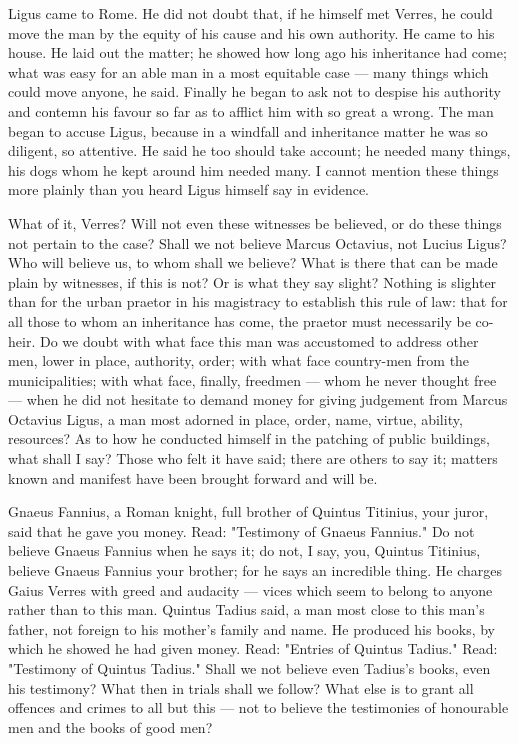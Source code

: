  Ligus came to Rome. He did not doubt that, if he himself met Verres, he could move the man by the equity of his cause and his own authority. He came to his house. He laid out the matter; he showed how long ago his inheritance had come; what was easy for an able man in a most equitable case --- many things which could move anyone, he said. Finally he began to ask not to despise his authority and contemn his favour so far as to afflict him with so great a wrong. The man began to accuse Ligus, because in a windfall and inheritance matter he was so diligent, so attentive. He said he too should take account; he needed many things, his dogs whom he kept around him needed many. I cannot mention these things more plainly than you heard Ligus himself say in evidence.

 What of it, Verres? Will not even these witnesses be believed, or do these things not pertain to the case? Shall we not believe Marcus Octavius, not Lucius Ligus? Who will believe us, to whom shall we believe? What is there that can be made plain by witnesses, if this is not? Or is what they say slight? Nothing is slighter than for the urban praetor in his magistracy to establish this rule of law: that for all those to whom an inheritance has come, the praetor must necessarily be co-heir. Do we doubt with what face this man was accustomed to address other men, lower in place, authority, order; with what face country-men from the municipalities; with what face, finally, freedmen --- whom he never thought free --- when he did not hesitate to demand money for giving judgement from Marcus Octavius Ligus, a man most adorned in place, order, name, virtue, ability, resources? As to how he conducted himself in the patching of public buildings, what shall I say? Those who felt it have said; there are others to say it; matters known and manifest have been brought forward and will be.

 Gnaeus Fannius, a Roman knight, full brother of Quintus Titinius, your juror, said that he gave you money. Read: "Testimony of Gnaeus Fannius." Do not believe Gnaeus Fannius when he says it; do not, I say, you, Quintus Titinius, believe Gnaeus Fannius your brother; for he says an incredible thing. He charges Gaius Verres with greed and audacity --- vices which seem to belong to anyone rather than to this man. Quintus Tadius said, a man most close to this man's father, not foreign to his mother's family and name. He produced his books, by which he showed he had given money. Read: "Entries of Quintus Tadius." Read: "Testimony of Quintus Tadius." Shall we not believe even Tadius's books, even his testimony? What then in trials shall we follow? What else is to grant all offences and crimes to all but this --- not to believe the testimonies of honourable men and the books of good men?

